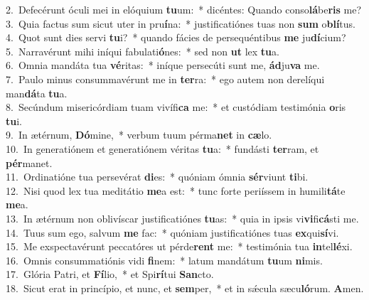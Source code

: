 {2.~}Defecérunt óculi mei in elóquium \textbf{tu}um:~* dicéntes: Quando conso\textbf{lá}be\textbf{ris} me?\\
{3.~}Quia factus sum sicut uter in pru\textbf{í}na:~* justificatiónes tuas non \textbf{sum} o\textbf{blí}tus.\\
{4.~}Quot sunt dies servi \textbf{tu}i?~* quando fácies de persequéntibus \textbf{me} ju\textbf{dí}cium?\\
{5.~}Narravérunt mihi iníqui fabulati\textbf{ó}nes:~* sed non \textbf{ut} lex \textbf{tu}a.\\
{6.~}Omnia mandáta tua \textbf{vé}ritas:~* iníque persecúti sunt me, \textbf{ád}ju\textbf{va} me.\\
{7.~}Paulo minus consummavérunt me in \textbf{ter}ra:~* ego autem non derelíqui man\textbf{dá}ta \textbf{tu}a.\\
{8.~}Secúndum misericórdiam tuam vivífi\textbf{ca} me:~* et custódiam testimónia \textbf{o}ris \textbf{tu}i.\\
{9.~}In ætérnum, \textbf{Dó}mine,~* verbum tuum pérma\textbf{net} in \textbf{cæ}lo.\\
{10.~}In generatiónem et generatiónem véritas \textbf{tu}a:~* fundásti \textbf{ter}ram, et \textbf{pér}manet.\\
{11.~}Ordinatióne tua persevérat \textbf{di}es:~* quóniam ómnia \textbf{sér}viunt \textbf{ti}bi.\\
{12.~}Nisi quod lex tua meditátio \textbf{me}a est:~* tunc forte periíssem in humili\textbf{tá}te \textbf{me}a.\\
{13.~}In ætérnum non oblivíscar justificatiónes \textbf{tu}as:~* quia in ipsis vi\textbf{vi}fi\textbf{cá}sti me.\\
{14.~}Tuus sum ego, salvum \textbf{me} fac:~* quóniam justificatiónes tuas \textbf{ex}qui\textbf{sí}vi.\\
{15.~}Me exspectavérunt peccatóres ut pérde\textbf{rent} me:~* testimónia tua \textbf{in}tel\textbf{lé}xi.\\
{16.~}Omnis consummatiónis vidi \textbf{fi}nem:~* latum mandátum \textbf{tu}um \textbf{ni}mis.\\
{17.~}Glória Patri, et \textbf{Fí}lio,~* et Spi\textbf{rí}tui \textbf{San}cto.\\
{18.~}Sicut erat in princípio, et nunc, et \textbf{sem}per,~* et in sǽcula sæcu\textbf{ló}rum. \textbf{A}men.\\
